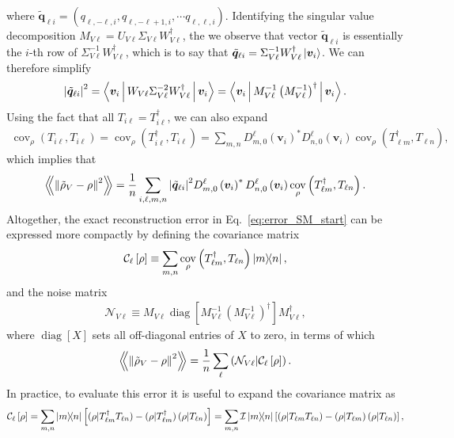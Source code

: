 \documentclass[notitlepage,twocolumn]{revtex4-2}
\newcommand{\f}[2]{\dfrac{#1}{#2}} %
\newcommand{\p}[1]{\left(#1\right)} %
\renewcommand{\sp}[1]{\left[#1\right]} %
\newcommand{\bk}{\Braket} %
\renewcommand{\v}{\bm} %
\newcommand{\Bbk}[1]
{\left\langle\!\!\left\langle #1 \right\rangle\!\!\right\rangle}
\newcommand{\C}{\mathcal{C}}
\newcommand{\I}{\mathcal{I}}
\newcommand{\N}{\mathcal{N}}
\def\obk#1{\mathinner{({#1})}}
\DeclareMathOperator{\cov}{cov}
\DeclareMathOperator{\diag}{diag}
\begin{document}
where $\tilde{\v q}_{\ell i} = (q_{\ell,-\ell,i},q_{\ell,-\ell+1,i},\cdots q_{\ell,\ell,i})$.
Identifying the singular value decomposition $M_{V\ell} = U_{V\ell} \Sigma_{V\ell} W_{V\ell}^\dag$, the we observe that vector $\tilde{\v q}_{\ell i}$ is essentially the $i$-th row of $\Sigma_{V\ell}^{-1} W_{V\ell}^\dag$, which is to say that $\tilde{\v q}_{\ell i} = \Sigma_{V\ell}^{-1} W_{V\ell}^\dag \ket{\v v_i}$.
We can therefore simplify
\begin{align}
  \abs{\tilde{\v q}_{\ell i}}^2
  = \bk{\v v_i | W_{V\ell} \Sigma_{V\ell}^{-2} W_{V\ell}^\dag | \v v_i}
  = \bk{\v v_i| M_{V\ell}^{-1} \p{M_{V\ell}^{-1}}^\dag | \v v_i}.
\end{align}
Using the fact that all $T_{i\ell}=T_{i\ell}^\dag$, we can also expand
\begin{align}
  \cov_\rho\p{T_{i\ell},T_{i\ell}}
  = \cov_\rho\p{T_{i\ell}^\dag,T_{i\ell}}
  = \sum_{m,n} D^\ell_{m,0}\p{\v v_i}^* D^\ell_{n,0}\p{\v v_i}
  \cov_\rho\p{T_{\ell m}^\dag, T_{\ell n}},
\end{align}
which implies that
\begin{align}
  \Bbk{\norm{\tilde\rho_V-\rho}^2}
  = \f1n \sum_{i,\ell,m,n}
  \abs{\tilde{\v q}_{\ell i}}^2
  D^\ell_{m,0}\p{\v v_i}^* D^\ell_{n,0}\p{\v v_i}
  \cov_\rho\p{T_{\ell m}^\dag, T_{\ell n}}.
\end{align}
Altogether, the exact reconstruction error in Eq.~\eqref{eq:error_SM_start} can be expressed more compactly by defining the covariance matrix
\begin{align}
  \C_\ell\sp{\rho} \equiv
  \sum_{m,n} \cov_\rho\p{T_{\ell m}^\dag, T_{\ell n}} \op{m}{n},
\end{align}
and the noise matrix
\begin{align}
  \N_{V\ell} \equiv M_{V\ell} \diag\sp{M_{V\ell}^{-1}
    \p{M_{V\ell}^{-1}}^\dag} M_{V\ell}^\dag,
\end{align}
where $\diag\sp{X}$ sets all off-diagonal entries of $X$ to zero, in terms of which
\begin{align}
  \Bbk{\norm{\tilde\rho_V-\rho}^2}
  = \f1n \sum_\ell \obk{\N_{V\ell}|\C_\ell\sp{\rho}}.
  \label{eq:error_SM}
\end{align}
In practice, to evaluate this error it is useful to expand the covariance matrix as
\begin{align}
  \C_\ell\sp{\rho}
  = \sum_{m,n} \op{m}{n} \sp{\obk{\rho|T_{\ell m}^\dag T_{\ell n}}
    - \obk{\rho|T_{\ell m}^\dag} \obk{\rho|T_{\ell n}}}
  = \sum_{m,n} \I\op{m}{n} \sp{\obk{\rho|T_{\ell m} T_{\ell n}}
    - \obk{\rho|T_{\ell m}} \obk{\rho|T_{\ell n}}},
\end{align}
\end{document}
